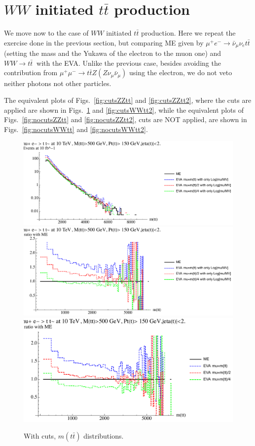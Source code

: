 \documentclass[a4paper,11pt]{article}
\begin{document}
\clearpage

\section{$WW$ initiated $t \bar t$ production}

We move now to the case of $WW$ initiated $t \bar t$ production. Here we repeat the exercise done in the previous section, but comparing ME given by $\mu^+e^-\to\bar \nu_\mu \nu_e t \bar t$ (setting the mass and the Yukawa of the electron to the muon one) and $WW\to t \bar t~$ with the EVA. Unlike the previous case, besides avoiding the contribution from $\mu^+\mu^-\to t \bar t Z (Z \nu_\mu \bar \nu_\mu )$ using the electron, we do not veto neither photons not other particles.

The equivalent plots of Figs.~\ref{fig:cutsZZtt} and \ref{fig:cutsZZtt2}, where the cuts are applied  are shown in Figs.~\ref{fig:cutsWWtt} and \ref{fig:cutsWWtt2}, while the  equivalent plots of Figs.~\ref{fig:nocutsZZtt} and \ref{fig:nocutsZZtt2}, cuts are NOT applied,  are shown in Figs.~\ref{fig:nocutsWWtt} and \ref{fig:nocutsWWtt2}. 


\begin{figure}[!t]
\includegraphics[width=0.46\linewidth]{Notebooks/PlotDistr/WW_tt/10TeVcuts/plotmtt.pdf}
\includegraphics[width=0.46\linewidth]{Notebooks/PlotDistr/WW_tt/10TeVcuts/plotmttratio1.pdf}
\includegraphics[width=0.46\linewidth]{Notebooks/PlotDistr/WW_tt/10TeVcuts/plotmttratio2.pdf}
\caption{With cuts, $m(t \bar t)$ distributions. \label{fig:cutsWWtt}}
\end{figure}
\end{document}
